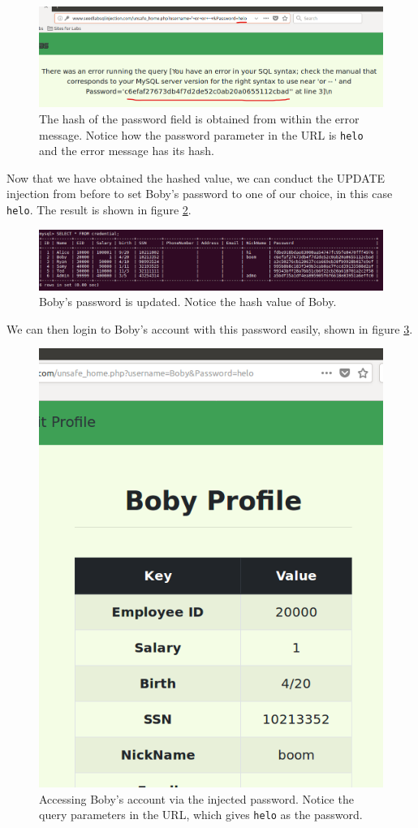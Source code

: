 \documentclass[12pt,reqno]{amsart}
\newcommand{\code}[1]{\texttt{#1}}
\begin{document}
\begin{figure}[h]
  \includegraphics[width=\linewidth]{img/SQL_BOBPASS_1.png}
  \caption{The hash of the password field is obtained from within the error message. Notice how the password parameter in the URL is \code{helo} and the error message has its hash.}
  \label{fig:7}
\end{figure}

Now that we have obtained the hashed value, we can conduct the UPDATE injection from before to set Boby's password to one of our choice, in this case \code{helo}. The result is shown in figure \ref{fig:8}.

\begin{figure}[h]
  \includegraphics[width=\linewidth]{img/SQL_BOBPASS_2.png}
  \caption{Boby's password is updated. Notice the hash value of Boby.}
  \label{fig:8}
\end{figure}

We can then login to Boby's account with this password easily, shown in figure \ref{fig:9}.

\begin{figure}[h]
  \includegraphics[width=0.35\linewidth]{img/SQL_BOBPASS_3.png}
  \caption{Accessing Boby's account via the injected password. Notice the query parameters in the URL, which gives \code{helo} as the password.}
  \label{fig:9}
\end{figure}
\end{document}

